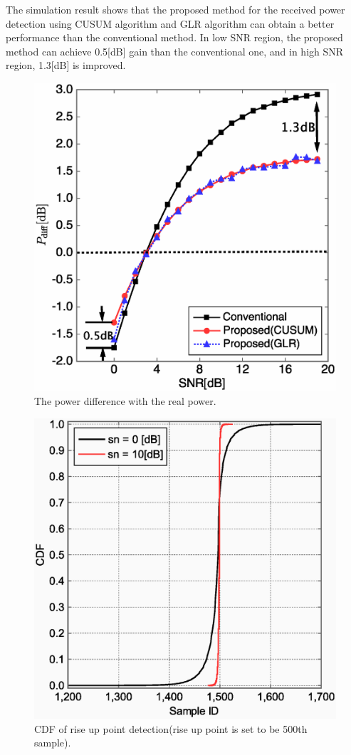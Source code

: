 The simulation result shows that the proposed method for the received power detection using CUSUM algorithm and GLR algorithm can obtain a better performance than the conventional method. In low SNR region, the proposed method can achieve 0.5[dB] gain than the conventional one, and in high SNR region, 1.3[dB] is improved.

\begin{figure}[t]
\centering
\includegraphics[width=120mm]{powdiff.eps}
\caption{The power difference with the real power.}
\label{Powdiff}
\end{figure}

\begin{figure}[t]
\centering
\includegraphics[width=120mm]{cdf_OFF2ON.eps}
\caption{CDF of rise up point detection(rise up point is set to be 500th sample).}
\label{cdf_off2on}
\end{figure}


